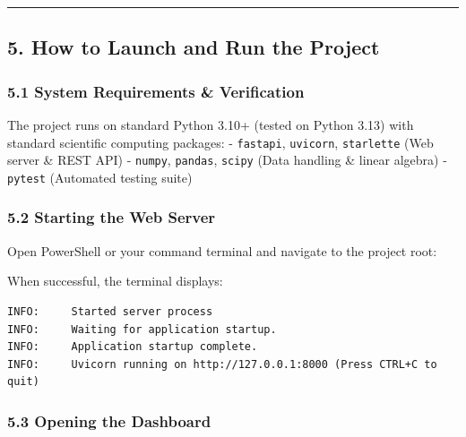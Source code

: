 \begin{center}\rule{0.5\linewidth}{0.5pt}\end{center}

\subsection{5. How to Launch and Run the
Project}\label{how-to-launch-and-run-the-project}

\subsubsection{5.1 System Requirements \&
Verification}\label{system-requirements-verification}

The project runs on standard Python 3.10+ (tested on Python 3.13) with
standard scientific computing packages: - \texttt{fastapi},
\texttt{uvicorn}, \texttt{starlette} (Web server \& REST API) -
\texttt{numpy}, \texttt{pandas}, \texttt{scipy} (Data handling \& linear
algebra) - \texttt{pytest} (Automated testing suite)

\subsubsection{5.2 Starting the Web
Server}\label{starting-the-web-server}

Open PowerShell or your command terminal and navigate to the project
root:

\begin{Shaded}
\begin{Highlighting}[]
\OperatorTok{:}
\OperatorTok{:}\OperatorTok{{-}{-}} \OperatorTok{{-}{-}}
\end{Highlighting}
\end{Shaded}

When successful, the terminal displays:

\begin{verbatim}
INFO:     Started server process
INFO:     Waiting for application startup.
INFO:     Application startup complete.
INFO:     Uvicorn running on http://127.0.0.1:8000 (Press CTRL+C to quit)
\end{verbatim}

\subsubsection{5.3 Opening the Dashboard}\label{opening-the-dashboard}

